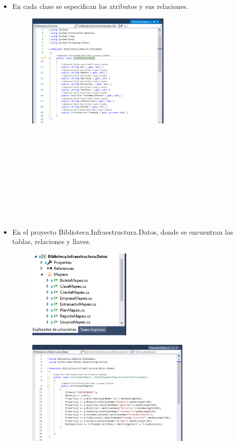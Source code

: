 \documentclass[twoside,twocolumn]{article}
\begin{document}
\begin{itemize}
	\item En cada clase se especifican los atributos y sus relaciones.
\begin{figure}[htb]
\begin{center}
\includegraphics[width=7cm]{./Imagenes/2-2}
\end{center}
\end{figure}
\\
\\
\\
\\
\\
\\
\\
\\
\\
	\item En el proyecto Biblioteca.Infraestructura.Datos, donde se encuentran las tablas, relaciones y llaves.
\begin{figure}[htb]
\begin{center}
\includegraphics[width=5cm]{./Imagenes/3}
\end{center}
\end{figure}
\begin{figure}[htb]
\begin{center}
\includegraphics[width=8cm]{./Imagenes/3-1}

\end{center}
\end{figure}
\end{itemize}
\end{document}
